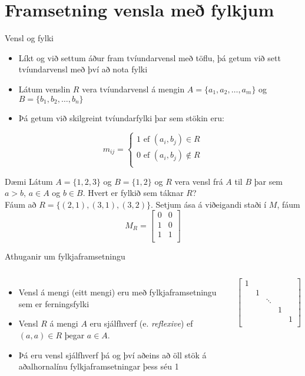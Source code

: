 \documentclass{beamer}
\begin{document}
\section{Framsetning vensla með fylkjum}

\begin{frame}{Vensl og fylki}
\begin{itemize}
 \item Líkt og við settum áður fram tvíundarvensl með töflu, þá getum við sett tvíundarvensl með því að nota fylki
 \item Látum venslin $R$ vera tvíundarvensl á mengin $A = \{a_1, a_2, \ldots, a_m \}$ og $B = \{b_1, b_2, \ldots, b_n\}$
 \item Þá getum við skilgreint tvíundarfylki þar sem stökin eru:
\end{itemize}
\[
 m_{ij} = \left\{
\begin{matrix}
1 \text{ ef } (a_i, b_j) \in R\\
0 \text{ ef } (a_i, b_j) \notin R\\
\end{matrix}\right.
\]
\end{frame}

\begin{frame}{Dæmi}
Látum $A= \{1, 2, 3\}$ og $B = \{1, 2\}$ og $R$ vera vensl frá $A$ til $B$ þar sem $a > b$, $a \in A$ og $b \in B$. Hvert er fylkið sem táknar $R$?\\
\pause
Fáum að $R= \{(2, 1), (3, 1), (3, 2)\}$. Setjum ása á viðeigandi staði í $M$, fáum 
\[
 M_R =
\begin{bmatrix}
0 & 0\\
1 & 0\\
1 & 1\\
\end{bmatrix}
\]
\end{frame}

\begin{frame}{Athuganir um fylkjaframsetningu}
\begin{columns}
\begin{itemize}
 \item Vensl á mengi (eitt mengi) eru með fylkjaframsetningu sem er ferningsfylki
 \item Vensl $R$ á mengi $A$ eru sjálfhverf (e. \emph{reflexive}) ef $(a, a) \in R$ þegar $a \in A$.
 \item Þá eru vensl sjálfhverf þá og því aðeins að öll stök á aðalhornalínu fylkjaframsetningar þess séu 1
\end{itemize}
\[
\begin{bmatrix}
1&&&&\\
&1&&&\\
&&\ddots&&\\
&&&1&\\
&&&&1\\
\end{bmatrix}
\]
\end{columns}
\end{frame}
\end{document}
